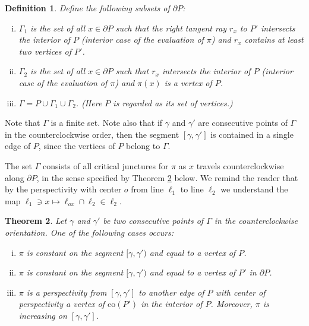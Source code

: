 \documentclass[11pt]{amsart}
\newtheorem{theorem}{Theorem}[section]
\newtheorem{definition}[theorem]{Definition}
\theoremstyle{remark}
\numberwithin{equation}{section}
\newcommand{\co}{\mathrm{co}}
\begin{document}
\begin{definition}\label{Gammasets}
Define the following subsets of $\partial P$:
\begin{enumerate}[(i)]
\item
$\Gamma_1$ is the set of all $x\in \partial P$ such that the right tangent ray $r_x$ to $P'$ intersects the interior of $P$ (interior case of the evaluation of $\pi$) and $r_x$ contains at least two vertices of $P'$.
\item
$\Gamma_2$ is the set of all $x\in \partial P$ such that $r_x$ intersects the interior of $P$ (interior case of the evaluation of $\pi$) and $\pi(x)$ is a vertex of $P$.
\item 
$\Gamma=P\cup \Gamma_1\cup \Gamma_2$. (Here $P$ is regarded as  its set of vertices.)
\end{enumerate}
\end{definition}



Note that $\Gamma$ is a finite set. Note also that
if $\gamma$ and $\gamma'$ are consecutive points of $\Gamma$ in the counterclockwise order,  then the segment $[\gamma,\gamma']$ is contained in a single edge of $P$, since the vertices of $P$ belong to $\Gamma$.

The set $\Gamma$ consists of all critical junctures for $\pi$ as $x$ travels counterclockwise along $\partial P$, in the sense specified by Theorem \ref{gamma} below.
We remind the reader that by the perspectivity with center $o$ from line  $\ell_1$ to line $\ell_2$  we understand  the map 
$\ell_1\ni x\mapsto  \ell_{ox}\cap \ell_2\in \ell_2$.


\begin{theorem}\label{gamma}
Let $\gamma$ and $\gamma'$ be two consecutive points of $\Gamma$ in the counterclockwise orientation. One of the following cases occurs:
\begin{enumerate}[(i)]
\item
$\pi$ is constant on the segment $[\gamma,\gamma')$ and equal to a vertex of $P$. 
\item
$\pi$ is constant on the segment $[\gamma,\gamma')$ and equal to a vertex of $P'$ in $\partial P$. 
\item
$\pi$ is a perspectivity from $[\gamma,\gamma']$ to another edge of $P$ with center of perspectivity a vertex of $\co(P')$ in the interior of $P$. 
Moreover, $\pi$ is increasing  on $[\gamma,\gamma']$.
\end{enumerate}
\end{theorem}
\end{document}
